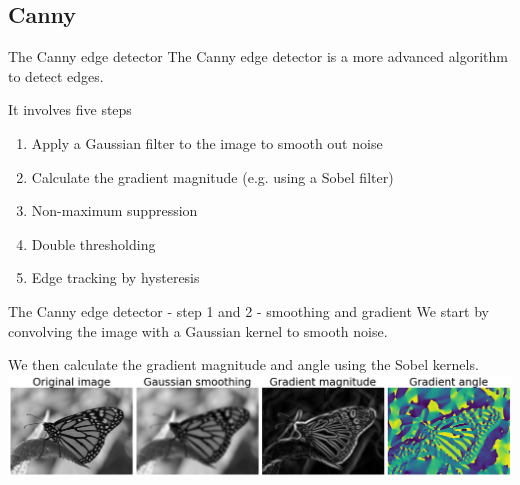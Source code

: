 \documentclass[9pt, aspectratio=169]{beamer}
\begin{document}


\subsection {Canny}
\begin{frame}
    {The Canny edge detector}
    The Canny edge detector is a more advanced algorithm to detect edges.

    It involves five steps

    \begin{enumerate}
        \item Apply a Gaussian filter to the image to smooth out noise
        \item Calculate the gradient magnitude (e.g. using a Sobel filter)
        \item Non-maximum suppression
        \item Double thresholding
        \item Edge tracking by hysteresis
    \end{enumerate}
\end{frame}

\begin{frame}
    {The Canny edge detector - step 1 and 2 - smoothing and gradient}
    We start by convolving the image with a Gaussian kernel to smooth noise.

    We then calculate the gradient magnitude and angle using the Sobel kernels.
    \centering
    \includegraphics[width=\textwidth]{canny_step1-2.png}
\end{frame}
\end{document}
